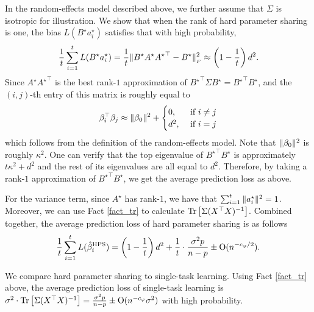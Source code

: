 \begin{example}\label{ex_same_cov}
In the random-effects model described above, we further assume that $\Sigma$ is isotropic for illustration. We show that when the rank of hard parameter sharing is one, the bias $L(B^{\star} a_i^{\star})$ satisfies that with high probability, 
\[ \frac{1}{t} \sum_{i=1}^t L(B^{\star} a_i^{\star}) = \frac{1}{t}\|B^{\star} A^{\star} {A^{\star}}^{\top} - B^{\star}\|_{_{F}}^2 \approx \left(1 - \frac{1}{t}\right) {d^2}{}  . \]
Since $A^{\star} {A^{\star}}^{\top}$ is the best rank-$1$ approximation of ${B^{\star}}^{\top}\Sigma B^{\star} = {B^{\star}}^{\top} B^{\star}$, and the $(i, j)$-th entry of this matrix is roughly equal to
\begin{align*}
	\beta_i^{\top} \beta_j \approx \|\beta_0\|^2 + \begin{cases}
																								0, &\text{ if } i \neq j \\
																								d^2, &\text{ if } i = j
	\end{cases}
\end{align*}
which follows from the definition of the random-effects model.
Note that $\|\beta_0\|^2$ is roughly $\kappa^2$.
One can verify that the top eigenvalue of ${B^{\star}}^{\top} B^{\star}$ is approximately $t \kappa^2 + d^2$ and the rest of its eigenvalues are all equal to $d^2$.
Therefore, by taking a rank-$1$ approximation of ${B^{\star}}^{\top} B^{\star}$, we get the average prediction loss as above.

For the variance term, since $A^{\star}$ has rank-$1$, we have that $\sum_{i=1}^t \|a_i^{\star}\|^2 = 1$. Moreover, we can use Fact \ref{fact_tr} to calculate $\operatorname{Tr}\left[\Sigma (X^{\top} X)^{-1}\right]$. 
Combined together, the average prediction loss of hard parameter sharing is as follows
\[ \frac{1}{t}\sum_{i=1}^t L(\hat{\beta}_i^{\textup{HPS}}) = \left({1 - \frac{1}{t}}\right) {d^2}{} + \frac{1}{t} \cdot \frac{\sigma^2 p}{n - p} \pm \operatorname{O}(n^{-c_{\varphi} / 2}) .\] %
\end{example}
We compare hard parameter sharing to single-task learning.
Using Fact \ref{fact_tr} above, the average prediction loss of single-task learning is $\sigma^2\cdot \operatorname{Tr}\left[\Sigma (X^{\top} X)^{-1}\right] = \frac{\sigma^2 p}{n - p}  \pm \operatorname{O}(n^{-c_\varphi} \sigma^2)$ with high probability.
